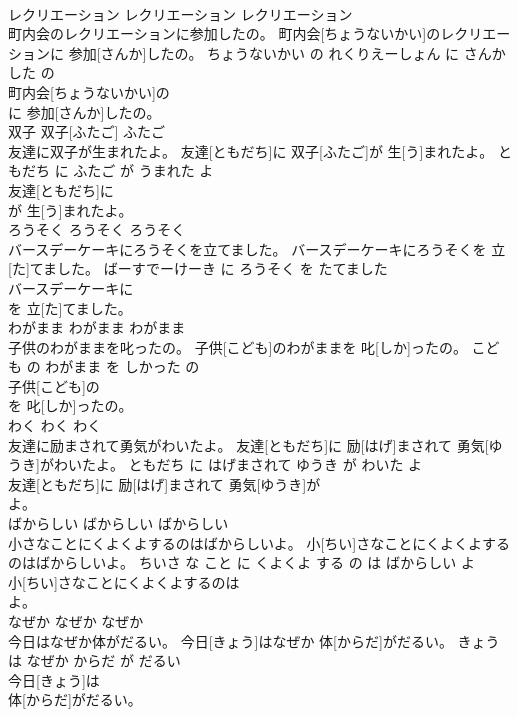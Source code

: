 \documentclass[8pt]{extreport}
\begin{document}
\begin{CJK}{UTF8}{min}
\\	レクリエーション	レクリエーション	レクリエーション	
\\	町内会のレクリエーションに参加したの。	町内会[ちょうないかい]のレクリエーションに 参加[さんか]したの。	ちょうないかい の れくりえーしょん に さんか した の	
\\	町内会[ちょうないかい]の
\\	に 参加[さんか]したの。			
\\	双子	双子[ふたご]	ふたご	
\\	友達に双子が生まれたよ。	友達[ともだち]に 双子[ふたご]が 生[う]まれたよ。	ともだち に ふたご が うまれた よ	
\\	友達[ともだち]に
\\	が 生[う]まれたよ。			
\\	ろうそく	ろうそく	ろうそく	
\\	バースデーケーキにろうそくを立てました。	バースデーケーキにろうそくを 立[た]てました。	ばーすでーけーき に ろうそく を たてました	
\\	バースデーケーキに
\\	を 立[た]てました。			
\\	わがまま	わがまま	わがまま	
\\	子供のわがままを叱ったの。	子供[こども]のわがままを 叱[しか]ったの。	こども の わがまま を しかった の	
\\	子供[こども]の
\\	を 叱[しか]ったの。			
\\	わく	わく	わく	
\\	友達に励まされて勇気がわいたよ。	友達[ともだち]に 励[はげ]まされて 勇気[ゆうき]がわいたよ。	ともだち に はげまされて ゆうき が わいた よ	
\\	友達[ともだち]に 励[はげ]まされて 勇気[ゆうき]が
\\	よ。			
\\	ばからしい	ばからしい	ばからしい	
\\	小さなことにくよくよするのはばからしいよ。	小[ちい]さなことにくよくよするのはばからしいよ。	ちいさ な こと に くよくよ する の は ばからしい よ	
\\	小[ちい]さなことにくよくよするのは
\\	よ。			
\\	なぜか	なぜか	なぜか	
\\	今日はなぜか体がだるい。	今日[きょう]はなぜか 体[からだ]がだるい。	きょう は なぜか からだ が だるい	
\\	今日[きょう]は
\\	体[からだ]がだるい。			

\end{CJK}
\end{document}
